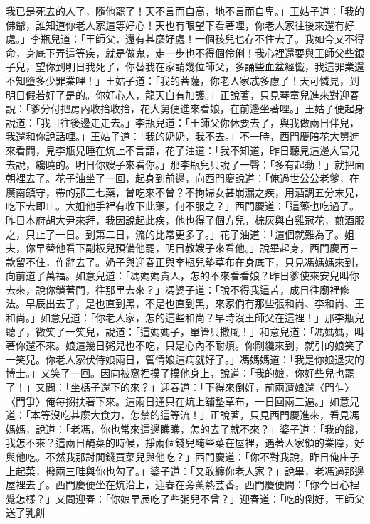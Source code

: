 我已是死去的人了，隨他罷了！天不言而自高，地不言而自卑。」王姑子道：「我的佛爺，誰知道你老人家這等好心！天也有眼望下看著哩，你老人家往後來還有好處。」李瓶兒道：「王師父，還有甚麼好處！一個孩兒也存不住去了。我如今又不得命，身底下弄這等疾，就是做鬼，走一步也不得個伶俐！我心裡還要與王師父些銀子兒，望你到明日我死了，你替我在家請幾位師父，多誦些血盆經懺，我這罪業還不知墮多少罪業哩！」王姑子道：「我的菩薩，你老人家忒多慮了！天可憐見，到明日假若好了是的。你好心人，龍天自有加護。」正說著，只見琴童兒進來對迎春說：「爹分付把房內收拾收拾，花大舅便進來看娘，在前邊坐著哩。」王姑子便起身說道：「我且往後邊走走去。」李瓶兒道：「王師父你休要去了，與我做兩日伴兒，我還和你說話哩。」王姑子道：「我的奶奶，我不去。」不一時，西門慶陪花大舅進來看問，見李瓶兒睡在炕上不言語，花子油道：「我不知道，昨日聽見這邊大官兒去說，纔曉的。明日你嫂子來看你。」那李瓶兒只說了一聲：「多有起動！」就把面朝裡去了。花子油坐了一回，起身到前邊，向西門慶說道：「俺過世公公老爹，在廣南鎮守，帶的那三七藥，曾吃來不曾？不拘婦女甚崩漏之疾，用酒調五分末兒，吃下去即止。大姐他手裡有收下此藥，何不服之？」西門慶道：「這藥也吃過了。昨日本府胡大尹來拜，我因說起此疾，他也得了個方兒，棕灰與白雞冠花，煎酒服之，只止了一日。到第二日，流的比常更多了。」花子油道：「這個就難為了。姐夫，你早替他看下副板兒預備他罷，明日教嫂子來看他。」說畢起身，西門慶再三款留不住，作辭去了。奶子與迎春正與李瓶兒墊草布在身底下，只見馮媽媽來到，向前道了萬福。如意兒道：「馮媽媽貴人，怎的不來看看娘？昨日爹使來安兒叫你去來，說你鎖著門，往那里去來？」馮婆子道：「說不得我這苦，成日往廟裡修法。早辰出去了，是也直到黑，不是也直到黑，來家倘有那些張和尚、李和尚、王和尚。」如意兒道：「你老人家，怎的這些和尚？早時沒王師父在這裡！」那李瓶兒聽了，微笑了一笑兒，說道：「這媽媽子，單管只撒風！」和意兒道：「馮媽媽，叫著你還不來。娘這幾日粥兒也不吃，只是心內不耐煩。你剛纔來到，就引的娘笑了一笑兒。你老人家伏侍娘兩日，管情娘這病就好了。」馮媽媽道：「我是你娘退灾的博士。」又笑了一回。因向被窩裡摸了摸他身上，說道：「我的娘，你好些兒也罷了！」又問：「坐榪子還下的來？」迎春道：「下得來倒好，前兩遭娘還〈門乍〉〈門爭〉俺每搊扶著下來。這兩日通只在炕上舖墊草布，一日回兩三遍。」如意兒道：「本等沒吃甚麼大食力，怎禁的這等流！」正說著，只見西門慶進來，看見馮媽媽，說道：「老馮，你也常來這邊瞧瞧，怎的去了就不來？」婆子道：「我的爺，我怎不來？這兩日醃菜的時候，掙兩個錢兒醃些菜在屋裡，遇著人家領的業障，好與他吃。不然我那討閒錢買菜兒與他吃？」西門慶道：「你不對我說，昨日俺庄子上起菜，撥兩三畦與你也勾了。」婆子道：「又敢纏你老人家？」說畢，老馮過那邊屋裡去了。西門慶便坐在炕沿上，迎春在旁薰熱芸香。西門慶便問：「你今日心裡覺怎樣？」又問迎春：「你娘早辰吃了些粥兒不曾？」迎春道：「吃的倒好，王師父送了乳餅 